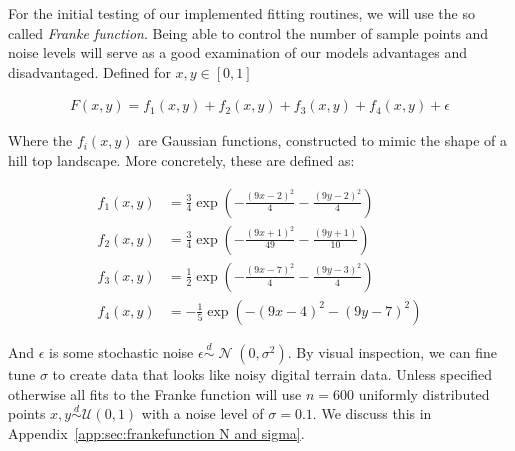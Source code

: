 \documentclass[twocolumn,english,notitlepage]{article}
\newcommand{\pclosed}[1]{\left(#1\right)}
\newcommand{\exptext}[1]{\operatorname{exp}\pclosed{#1}}
\newcommand{\normal}[2]{\operatorname{\mathcal{N}}\pclosed{#1,#2}}
\newcommand{\distas}{\overset{d}{\sim}}
\begin{document}
            For the initial testing of our implemented fitting routines, we will use the so called \textit{Franke function}. Being able to control the number of sample points and noise levels will serve as a good examination of our models advantages and disadvantaged. Defined for $x, y \in [0,1]$

            \begin{align}
                F(x,y) = f_1(x,y) + f_2(x,y) + f_3(x,y) + f_4(x,y) + \epsilon \label{met:eq:Franke_Function}
            \end{align}

            Where the $f_i(x,y)$ are Gaussian functions, constructed to mimic the shape of a hill top landscape. More concretely, these are defined as:

            \begin{align} \nonumber
                f_1(x,y) &= \frac{3}{4}\exptext{ -\frac{(9x-2)^2}{4} - \frac{(9y-2)^2}{4} } \nonumber \\
                f_2(x,y) &= \frac{3}{4}\exptext{ -\frac{(9x+1)^2}{49} - \frac{(9y+1)}{10}} \nonumber \\
                f_3(x,y) &= \frac{1}{2}\exptext{ -\frac{(9x-7)^2}{4} - \frac{(9y-3)^2}{4}} \nonumber \\
                f_4(x,y) &= -\frac{1}{5}\exptext{ -(9x-4)^2 - (9y-7)^2} \nonumber
            \end{align}

            And $\epsilon$ is some stochastic noise $\epsilon \distas \normal{0}{\sigma^2}$. By visual inspection, we can fine tune $\sigma$ to create data that looks like noisy digital terrain data. Unless specified otherwise all fits to the Franke function will use $n = 600$ uniformly distributed points $x,y \distas \mathcal{U}(0,1)$ with a noise level of $\sigma = 0.1$. We discuss this in Appendix~\ref{app:sec:frankefunction N and sigma}.   
\end{document}
